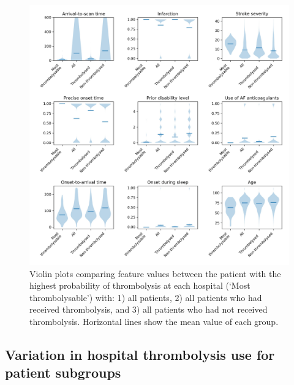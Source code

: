 \begin{figure}[!h]
\centering
\includegraphics[width=1.0\textwidth]{./images/02a_most_thrombolsyable_violin}
\caption{Violin plots comparing feature values between the patient with the highest probability of thrombolysis at each hospital (`Most thrombolysable') with: 1) all patients, 2) all patients who had received thrombolysis, and 3) all patients who had not received thrombolysis. Horizontal lines show the mean value of each group.}
\label{fig:results_most_thrombolysable}
\end{figure}


\iffalse
\subsection{Variation in hospital thrombolysis use for patient subgroups}

